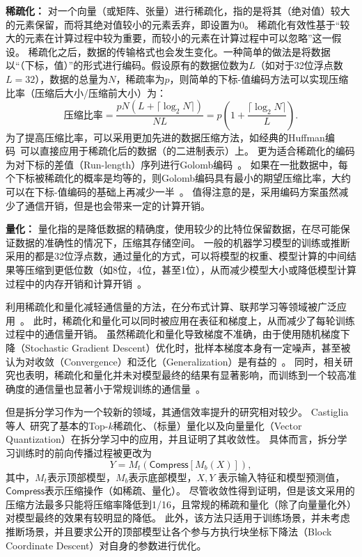 \textbf{稀疏化：}
对一个向量（或矩阵、张量）进行稀疏化，指的是将其（绝对值）较大的元素保留，而将其绝对值较小的元素丢弃，即设置为0。
%
稀疏化有效性基于“较大的元素在计算过程中较为重要，而较小的元素在计算过程中可以忽略”这一假设。
%
稀疏化之后，数据的传输格式也会发生变化。一种简单的做法是将数据以“（下标，值）”的形式进行编码。假设原有的数据位数为$L$（如对于32位浮点数$L=32$），数据的总量为$N$，稀疏率为$p$，则简单的下标-值编码方法可以实现压缩比率（压缩后大小/压缩前大小）为：
\begin{equation}
    \text{压缩比率}=\dfrac{pN(L + \lceil \log_2N \rceil)}{NL} = p(1 + \dfrac{\lceil \log_2N \rceil}{L}).
\end{equation}
为了提高压缩比率，可以采用更加先进的数据压缩方法，如经典的Huffman编码~\cite{huffman1952}可以直接应用于稀疏化后的数据（的二进制表示）上。
%
更为适合稀疏化的编码为对下标的差值（Run-length）序列进行Golomb编码~\cite{gallager1975golomb}。
%
如果在一批数据中，每个下标被稀疏化的概率是均等的，则Golomb编码具有最小的期望压缩比率，大约可以在下标-值编码的基础上再减少一半~\cite{sattler2019sparse_binary}。
%
值得注意的是，采用编码方案虽然减少了通信开销，但是也会带来一定的计算开销。


\textbf{量化：}
量化指的是降低数据的精确度，使用较少的比特位保留数据，在尽可能保证数据的准确性的情况下，压缩其存储空间。
%
一般的机器学习模型的训练或推断采用的都是32位浮点数，通过量化的方式，可以将模型的权重、模型计算的中间结果等压缩到更低位数（如8位，4位，甚至1位），从而减少模型大小或降低模型计算过程中的内存开销和计算开销~\cite{zhou2016dorefa,banner2018_8bit,yang2019quantization}。




利用稀疏化和量化减轻通信量的方法，在分布式计算、联邦学习等领域被广泛应用~\cite{wen2017terngrad,sattler2019sparse_binary}。
%
此时，稀疏化和量化可以同时被应用在表征和梯度上，从而减少了每轮训练过程中的通信量开销。
%
虽然稀疏化和量化导致梯度不准确，由于使用随机梯度下降（Stochastic Gradient Descent）优化时，批样本梯度本身有一定噪声，甚至被认为对收敛（Convergence）和泛化（Generalization）是有益的~\cite{hardt2016sgd,goyal2017sgd_imagenet,chaudhari2018sgd}。
%
同时，相关研究也表明，稀疏化和量化并未对模型最终的结果有显著影响，而训练到一个较高准确度的通信量也显著小于常规训练的通信量~\cite{aji2017sparse,sattler2019sparse_binary,wen2017terngrad}。

%
但是拆分学习作为一个较新的领域，其通信效率提升的研究相对较少。
%
Castiglia等人~\cite{castiglia2022compressed_vfl}研究了基本的Top-$k$稀疏化、（标量）量化以及向量量化（Vector Quantization）在拆分学习中的应用，并且证明了其收敛性。
%
具体而言，拆分学习训练时的前向传播过程被更改为
\begin{equation}
\label{eq:split-compress}
    Y = M_t(\mathsf{Compress}[M_b(X)]),
\end{equation}
%
其中，$M_t$表示顶部模型，$M_b$表示底部模型，$X, Y$ 表示输入特征和模型预测值，$\mathsf{Compress}$表示压缩操作（如稀疏、量化）。
%
尽管收敛性得到证明，但是该文采用的压缩方法最多只能将压缩率降低到1/16，且常规的稀疏和量化（除了向量量化外）对模型最终的效果有较明显的降低。
%
此外，该方法只适用于训练场景，并未考虑推断场景，并且要求公开的顶部模型让各个参与方执行块坐标下降法（Block Coordinate Descent）对自身的参数进行优化。

